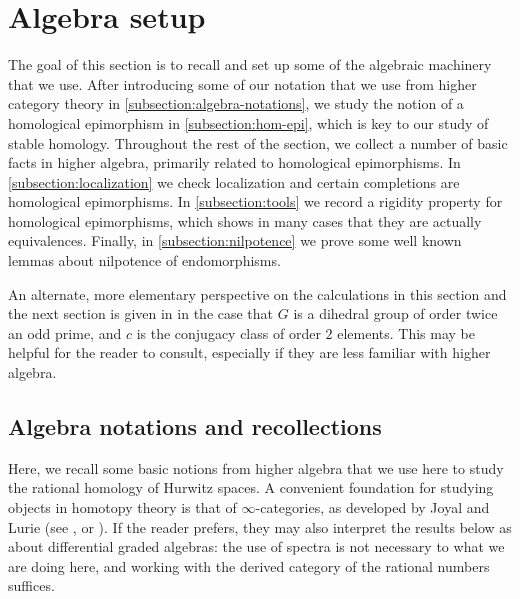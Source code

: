 \documentclass[12 pt]{amsart}
\theoremstyle{plain}
\theoremstyle{definition}
\theoremstyle{remark}
\numberwithin{equation}{section}
\begin{document}
\section{Algebra setup}
\label{section:algebra-background}
The goal of this section is to recall and set up some of the algebraic machinery
that we use. After introducing some of our notation that we use from higher
category theory in \autoref{subsection:algebra-notations}, we study the notion
of a homological epimorphism in \autoref{subsection:hom-epi}, which is key to our study of stable homology.
Throughout the rest of the section, we collect a number of basic facts in higher
algebra, primarily related to
homological epimorphisms. In 
\autoref{subsection:localization} we check localization and certain completions
are homological epimorphisms.
In \autoref{subsection:tools} we record a rigidity property for homological
epimorphisms, which shows in many cases that they are actually equivalences.
Finally, in \autoref{subsection:nilpotence}
we prove some well known lemmas about nilpotence of endomorphisms.

An alternate, more elementary perspective
on the calculations in this section and the next section is given in
\cite{landesmanL:an-alternate-computation} in the case that $G$ is a dihedral
group of order twice an odd prime, and $c$ is the conjugacy class of order $2$
elements.
This may be helpful for the reader to consult, especially if they are less
familiar with higher algebra.

\subsection{Algebra notations and recollections}
\label{subsection:algebra-notations}

Here, we recall some basic notions from higher algebra that we use here to study the rational homology of Hurwitz spaces. A convenient foundation for studying objects in homotopy theory is that of $\infty$-categories, as developed by Joyal and Lurie (see \cite{HTT}, \cite{HA} or \cite{kerodon}). If the reader prefers, they may also interpret the results below as about differential graded algebras: the use of spectra is not necessary to what we are doing here, and working with the derived category of the rational numbers suffices.%
\end{document}
